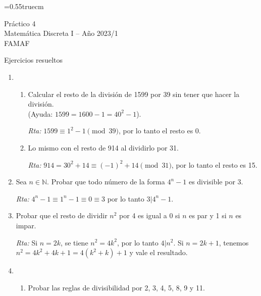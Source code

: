 \documentclass[a4paper,12pt,twoside,spanish,reqno]{amsbook}
\numberwithin{equation}{section}
\newcommand{\rta}{\noindent\textit{Rta: }}
\newcommand \N{{\mathbb N}}
\begin{document}
    \baselineskip=0.55truecm %

{\bf \begin{center} Práctico 4 \\ Matemática Discreta I -- Año 2023/1 \\ FAMAF \end{center}}

{\bf \begin{center} Ejercicios resueltos \end{center}}

\begin{enumerate}
\setlength\itemsep{1.1em}

    \item  
    \begin{enumerate}
        \item Calcular el resto de la división de 1599 por 39 sin tener que hacer la división. \\(Ayuda: $1599=1600-1=40^2-1$).
        
        \rta $1599\equiv 1^2-1\pmod{ 39}$, por lo tanto el resto es 0.
        
        \item Lo mismo con el resto de 914 al dividirlo por 31.
        
        \rta $914=30^2+14\equiv (-1)^2+14 \pmod{ 31}$, por lo tanto el resto es 15.
    \end{enumerate}
    
    
    
    \item Sea $n\in\N$. Probar que todo número de la forma $4^n-1$ es divisible por 3.
    
    \rta $4^n-1\equiv 1^n-1 \equiv 0 \equiv 3$ por lo tanto $3\vert 4^n-1$.
    
    
    \item Probar que el resto de dividir $n^2$ por 4 es igual a 0 si $n$ es par y 1 si $n$ es impar.
        
    \rta  Si $n=2k$, se tiene $n^2=4k^2$, por lo tanto $4\vert n^2$. Si $n=2k+1$, tenemos $n^2=4k^2+4k+1=4(k^2+k)+1$ y vale el resultado.
    
    
    
    
    \item
    \begin{enumerate}
        \item
        Probar las reglas de divisibilidad por 2, 3, 4, 5, 8, 9 y 11.%
            

\end{enumerate}
\end{enumerate}
\end{document}
